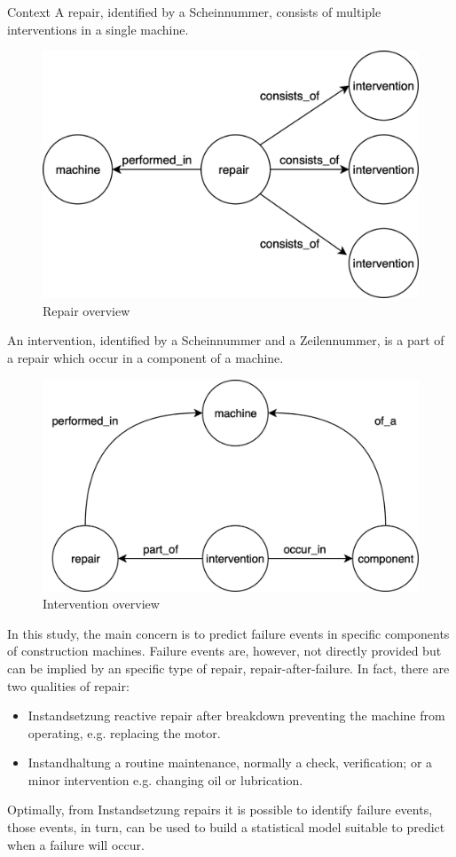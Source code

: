 \documentclass[t]{beamer}
\begin{document}
\begin{frame}[label={sec:orgc2b2963}]{}
\begin{columns}
\begin{column}{0.3\columnwidth}
\begin{block}{Context}
A repair, identified by a Scheinnummer, consists of multiple interventions in a single machine.
\begin{figure}[htbp]
\centering
\includegraphics[width=.9\linewidth]{./Logos/repair_schema.png}
\caption{\label{fig:org2f136f4}
Repair overview}
\end{figure}
An intervention, identified by a Scheinnummer and a Zeilennummer, is a part of a repair which occur in a component of a machine.
\begin{figure}[htbp]
\centering
\includegraphics[width=.9\linewidth]{./Logos/intervention_schema.png}
\caption{\label{fig:orge70631a}
Intervention overview}
\end{figure}
 In this study, the main concern is to predict failure events in specific components of
construction machines. Failure events are, however, not directly provided but can
be implied by an specific type of repair, repair-after-failure. In fact, there are two qualities of repair:
\begin{itemize}
\item \alert{Instandsetzung} reactive repair after breakdown preventing the machine from operating, e.g. replacing the motor.
\item \alert{Instandhaltung} a routine maintenance, normally a check, verification; or a minor intervention e.g. changing oil or lubrication.
\end{itemize}
Optimally, from Instandsetzung repairs it is possible to identify failure events, 
those events, in turn, can be used to build a statistical model suitable 
to predict when a failure will occur.
\end{block}


\end{column}
\end{columns}
\end{frame}
\end{document}
